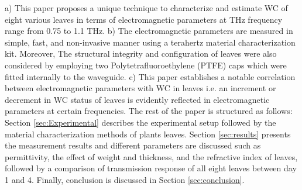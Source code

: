 \documentclass[journal,article,submit,moreauthors,pdftex]{Definitions/mdpi}
\renewcommand{\^}{\hat}  %
\begin{document}
%
%
a) This paper proposes a unique technique to characterize and estimate WC of eight various leaves in terms of electromagnetic parameters at THz frequency range from 0.75 to 1.1 THz.
b) The electromagnetic parameters are measured in simple, fast, and non-invasive manner using a terahertz material characterization kit. Moreover, The structural integrity and configuration of leaves were also considered by employing two Polytetrafluoroethylene (PTFE) caps which were fitted internally to the waveguide.
c) This paper establishes a notable correlation between electromagnetic parameters with WC in leaves i.e. an increment or decrement in WC status of leaves is evidently reflected in electromagnetic parameters at certain frequencies. The rest of the paper is structured as follows: Section \ref{sec:Experimental} describes the experimental setup followed by the material characterization methods of plants leaves. Section \ref{sec:results} presents the measurement results and different parameters are discussed such as permittivity, the effect of weight and thickness, and the refractive index of leaves, followed by a comparison of transmission response of all eight leaves between day 1 and 4. Finally, conclusion is discussed in Section \ref{sec:conclusion}.
\end{document}
